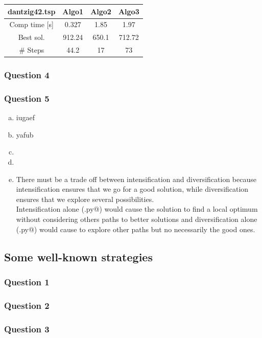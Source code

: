 \documentclass[a4paper,10pt]{article}
\begin{document}
\begin{center}
\begin{tabular}{|c|c|c|c|}
\hline 
dantzig42.tsp & Algo1 & Algo2 & Algo3 \\ 
\hline 
Comp time [s] & 0.327 & 1.85 & 1.97 \\ 
\hline 
Best sol. & 912.24 & 650.1 & 712.72 \\ 
\hline 
\# Steps & 44.2 & 17 & 73 \\ 
\hline 
\end{tabular} 
\end{center}
\subsubsection{Question 4}
\subsubsection{Question 5}
	\begin{enumerate}[(a)]
		\item iugaef
		\item yafub
		\item
		\item 
		\item There must be a trade off between intensification and diversification because intensification ensures that we go for a good solution, while diversification ensures that we explore several possibilities. \\
		Intensification alone (\verb@maxvalue.py@) would cause the solution to find a local optimum without considering others paths to better solutions and diversification alone (\verb@randomwalk.py@) would cause to explore other paths but no necessarily the good ones.
	\end{enumerate}

\subsection{Some well-known strategies}
\subsubsection{Question 1}
\subsubsection{Question 2}
\subsubsection{Question 3}
\end{document}
